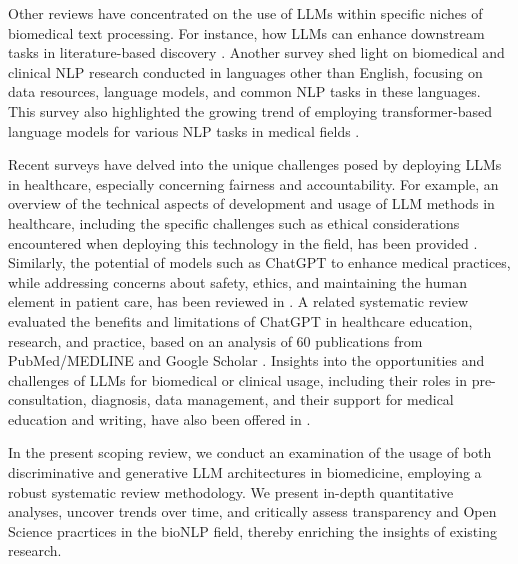 \documentclass[fleqn,10pt]{olplainarticle}
\begin{document}
Other reviews have concentrated on the use of LLMs within specific niches of biomedical text processing. For instance, how LLMs can enhance downstream tasks in literature-based discovery \cite{cesario2024survey}. Another survey shed light on biomedical and clinical NLP research conducted in languages other than English, focusing on data resources, language models, and common NLP tasks in these languages. This survey also highlighted the growing trend of employing transformer-based language models for various NLP tasks in medical fields \citep{shaitarova2023exploring}.

Recent surveys have delved into the unique challenges posed by deploying LLMs in healthcare, especially concerning fairness and accountability. For example, an overview of the technical aspects of development and usage of LLM methods in healthcare, including the specific challenges such as ethical considerations encountered when deploying this technology in the field, has been provided \citep{he2023survey}. Similarly, the potential of models such as ChatGPT to enhance medical practices, while addressing concerns about safety, ethics, and maintaining the human element in patient care, has been reviewed in \cite{thirunavukarasu2023large}. A related systematic review evaluated the benefits and limitations of ChatGPT in healthcare education, research, and practice, based on an analysis of 60 publications from PubMed/MEDLINE and Google Scholar \citep{sallam2023chatgpt}.  Insights into the opportunities and challenges of LLMs for biomedical or clinical usage, including their roles in pre-consultation, diagnosis, data management, and their support for medical education and writing, have also been offered in \citep{yang2023large}. %

In the present scoping review, we conduct an examination of the usage of both discriminative and generative LLM architectures in biomedicine, employing a robust systematic review methodology. We present in-depth quantitative analyses, uncover trends over time, and critically assess transparency and Open Science pracrtices in the bioNLP field, thereby enriching the insights of existing research.


\end{document}
